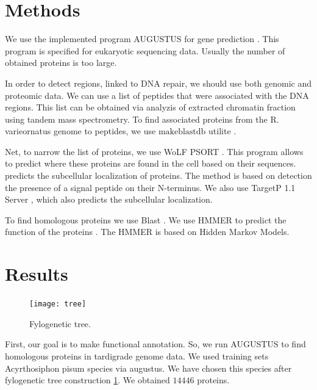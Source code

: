 \documentclass{article}
\begin{document}
\section{Methods}
 We use the implemented program AUGUSTUS for gene prediction \cite{augustus}. This program is specified for eukaryotic sequencing data. Usually the number of obtained proteins is too large. 
 
 In order to detect regions, linked to DNA repair, we should use both genomic and proteomic data. We can use a list of peptides that were associated with the DNA regions. This list can be obtained via analyzis of extracted chromatin fraction using tandem mass spectrometry. To find associated proteins from the R. varieornatus genome  to peptides, we use $\textrm{makeblastdb}$ utilite \cite{blast}.
 
 Net, to narrow the list of proteins, we use WoLF PSORT \cite{WOlf}. This program allows to predict where these proteins are found in the cell based on their sequences. predicts the subcellular localization of proteins. The method is based on detection the presence of a signal peptide on their N-terminus. We also use TargetP 1.1 Server \cite{ptarget}, which also predicts the subcellular localization.
 
 To find homologous proteins we use Blast \cite{2}. We use HMMER to predict the function of the proteins \cite{HMM}. The HMMER is based on Hidden Markov Models.  
 

\section{Results}
 \begin{figure}[h]
 	\centering
 	\texttt{[image: tree]}  
 	\caption{ Fylogenetic tree.}
 	\label{tree}
 \end{figure}
  First, our goal is to make functional annotation. So, we run AUGUSTUS to find homologous proteins in tardigrade genome data. We used training sets  Acyrthosiphon pisum species via augustus. We have chosen this species after  fylogenetic tree construction \ref{tree}.   We obtained $14446$ proteins. 
 
\end{document}
